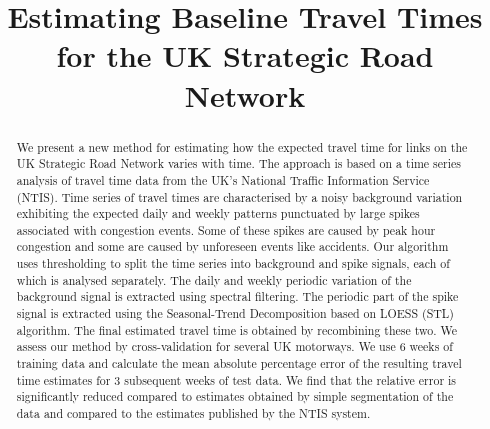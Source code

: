 \documentclass[conference]{IEEEtran}
\begin{document}
\title{Estimating Baseline Travel Times for the UK Strategic Road Network
}

\author{
\and
{}
\and
{}
}

\maketitle

\begin{abstract}
We present a new method for estimating how the expected travel time for links on the UK Strategic Road Network varies with time.  The approach is based on a time series analysis of travel time data from the UK's National Traffic Information Service (NTIS).  Time series of travel times are characterised by a noisy background variation exhibiting the expected daily and weekly patterns punctuated by large spikes associated with congestion events. Some of these spikes are caused by peak hour congestion and some are caused by unforeseen events like accidents. Our algorithm uses thresholding to split the time series into background and spike signals, each of which is analysed separately. The daily and weekly periodic variation of the background signal is extracted using spectral filtering. The periodic part of the spike signal is extracted using the Seasonal-Trend Decomposition based on LOESS (STL) algorithm. The final estimated travel time is obtained by recombining these two. We assess our method by cross-validation for several UK motorways. We use 6 weeks of training data and calculate the mean absolute percentage error of the resulting travel time estimates for 3 subsequent weeks of test data. We find that the relative error is significantly reduced compared to estimates obtained by simple segmentation of the data and compared to the estimates published by the NTIS system.
\end{abstract}
\end{document}
